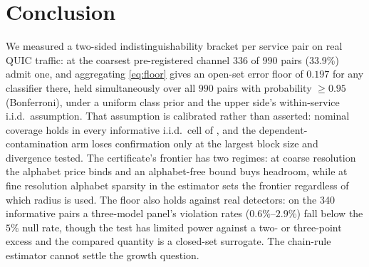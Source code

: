 \section{Conclusion}
\label{sec:conclusion}

We measured a two-sided indistinguishability bracket per service pair on real QUIC
traffic: at the coarsest pre-registered channel 336 of 990 pairs (33.9\%) admit one,
and aggregating \eqref{eq:floor} gives an open-set error floor of
$0.197$ for any classifier there, held simultaneously over all $990$ pairs with
probability $\ge 0.95$ (Bonferroni), under a uniform class prior and the upper
side's within-service i.i.d.\ assumption. That assumption is calibrated rather than
asserted: nominal coverage holds in every informative i.i.d.\ cell of
, and the dependent-contamination arm loses confirmation only
at the largest block size and divergence tested. The certificate's frontier has two
regimes: at coarse resolution the alphabet price binds and an alphabet-free bound
buys headroom, while at fine resolution alphabet sparsity in the estimator sets
the frontier regardless of which radius is used. The floor also holds against real
detectors: on the 340 informative pairs a three-model panel's violation rates
($0.6\%$--$2.9\%$) fall below the $5\%$ null rate, though the test has limited
power against a two- or three-point excess and the compared quantity is a closed-set
surrogate. The chain-rule estimator cannot settle the growth question.
